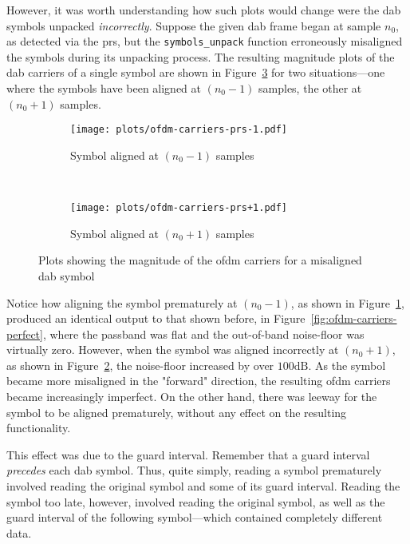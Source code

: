 \documentclass[class=report,11pt,crop=false]{standalone}
\begin{document}
However, it was worth understanding how such plots would change were the \gls{dab} symbols unpacked \emph{incorrectly}. Suppose the given \gls{dab} frame began at sample \(n_0\), as detected via the \gls{prs}, but the \texttt{symbols\_unpack} function erroneously misaligned the symbols during its unpacking process. The resulting magnitude plots of the \gls{dab} carriers of a single symbol are shown in Figure~\ref{fig:ofdm-carriers-prs} for two situations---one where the symbols have been aligned at \((n_0 - 1)\) samples, the other at \((n_0 + 1)\) samples.

\begin{figure}[htbp]
    \centering
    \captionsetup{type=figure}
    \begin{subfigure}[t]{0.45\textwidth}
      \centering
      \captionsetup{type=figure}
      \texttt{[image: plots/ofdm-carriers-prs-1.pdf]}
      \caption{Symbol aligned at \((n_0 - 1)\) samples}
      \label{fig:ofdm-carriers-prs-1}
    \end{subfigure}%
    ~ 
    \begin{subfigure}[t]{0.45\textwidth}
      \centering
      \captionsetup{type=figure}
      \texttt{[image: plots/ofdm-carriers-prs+1.pdf]}
      \caption{Symbol aligned at \((n_0 + 1)\) samples}
      \label{fig:ofdm-carriers-prs+1}
    \end{subfigure}
    \caption{Plots showing the magnitude of the \gls{ofdm} carriers for a misaligned \gls{dab} symbol}
    \label{fig:ofdm-carriers-prs}
  \end{figure}

Notice how aligning the symbol prematurely at \((n_0 - 1)\), as shown in Figure~\ref{fig:ofdm-carriers-prs-1}, produced an identical output to that shown before, in Figure~\ref{fig:ofdm-carriers-perfect}, where the passband was flat and the out-of-band noise-floor was virtually zero. However, when the symbol was aligned incorrectly at \((n_0 + 1)\), as shown in Figure~\ref{fig:ofdm-carriers-prs+1}, the noise-floor increased by over \(100\si{\deci\bel}\). As the symbol became more misaligned in the "forward" direction, the resulting \gls{ofdm} carriers became increasingly imperfect. On the other hand, there was leeway for the symbol to be aligned prematurely, without any effect on the resulting functionality.

This effect was due to the guard interval. Remember that a guard interval \emph{precedes} each \gls{dab} symbol. Thus, quite simply, reading a symbol prematurely involved reading the original symbol and some of its guard interval. Reading the symbol too late, however, involved reading the original symbol, as well as the guard interval of the following symbol---which contained completely different data.
\end{document}

